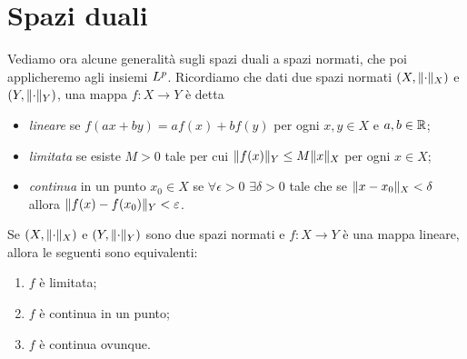 \section{Spazi duali}
Vediamo ora alcune generalità sugli spazi duali a spazi normati, che poi applicheremo agli insiemi $\lclass[p]$.
Ricordiamo che dati due spazi normati $(X,\norm{\cdot}_X)$ e $(Y,\norm{\cdot}_Y)$, una mappa $f\colon X\to Y$ è detta
\begin{itemize}
    \item \emph{lineare} se $f(ax+by)=af(x)+bf(y)$ per ogni $x,y\in X$ e $a,b\in\R$;
    \item \emph{limitata} se esiste $M>0$ tale per cui $\norm{f(x)}_Y\le M\norm{x}_X$ per ogni $x\in X$;
    \item \emph{continua} in un punto $x_0\in X$ se $\forall\epsilon>0$ $\exists\delta>0$ tale che se $\norm{x-x_0}_X<\delta$ allora $\norm{f(x)-f(x_0)}_Y<\epsilon$.
\end{itemize}
\begin{teorema} \label{t:continuita-limitatezza-linearita}
    Se $(X,\norm{\cdot}_X)$ e $(Y,\norm{\cdot}_Y)$ sono due spazi normati e $f\colon X\to Y$ è una mappa lineare, allora le seguenti sono equivalenti:
    \begin{enumerate}
        \item $f$ è limitata;
        \item $f$ è continua in un punto;
        \item $f$ è continua ovunque.
    \end{enumerate}
\end{teorema}
